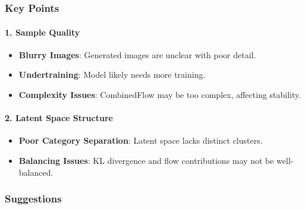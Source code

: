 \documentclass[11pt]{article}
\providecommand{\tightlist}{%
      \setlength{\itemsep}{0pt}\setlength{\parskip}{0pt}}
\begin{document}
    \begin{center}
    \end{center}
    { \hspace*{\fill} \\}
    
    \begin{center}
    \end{center}
    { \hspace*{\fill} \\}
    
    \subsubsection{Key Points}\label{key-points}

\paragraph{\texorpdfstring{1. \textbf{Sample
Quality}}{1. Sample Quality}}\label{sample-quality}

\begin{itemize}
\tightlist
\item
  \textbf{Blurry Images}: Generated images are unclear with poor detail.
\item
  \textbf{Undertraining}: Model likely needs more training.
\item
  \textbf{Complexity Issues}: CombinedFlow may be too complex, affecting
  stability.
\end{itemize}

\paragraph{\texorpdfstring{2. \textbf{Latent Space
Structure}}{2. Latent Space Structure}}\label{latent-space-structure}

\begin{itemize}
\tightlist
\item
  \textbf{Poor Category Separation}: Latent space lacks distinct
  clusters.
\item
  \textbf{Balancing Issues}: KL divergence and flow contributions may
  not be well-balanced.
\end{itemize}

\subsubsection{Suggestions}\label{suggestions}
\end{document}
